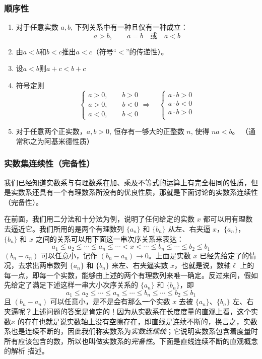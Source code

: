 \subsubsection{顺序性}
\begin{enumerate}
  \item 对于任意实数 $a,b$, 下列关系中有一种且仅有一种成立：
  \[a>b,\qquad a=b\quad \text{或}\quad a<b\]
  \item 由$a<b$和$b<c$推出$a<c$（符号“$<$”的传递性）。
  \item 设$a<b$则$a+c<b+c$
  \item 符号定则
  \[\begin{cases}
      a>0,\qquad b>0\\
      a>0,\qquad b<0\\
      a<0,\qquad b<0
  \end{cases}\Rightarrow\quad  \begin{cases}
      a\cdot b>0\\a\cdot b<0\\a\cdot b>0\\
  \end{cases}\]
  \item 对于任意两个正实数，$a,b>0$, 恒存有一够大的正整数 $n$, 使得 $na<b$。 （通常称之为阿基米德性质）
\end{enumerate}

\subsubsection{ 实数集连续性（完备性）}
我们已经知道实数系与有理数系在加、乘及不等式的运算上有完全相同的性质，但是实数系还具有一个有理数系所没有的优良性质，那就是下面讨论的实数系连续性（完备性）。

在前面，我们用二分法和十分法为例，说明了任何给定的实数 $x$ 都可以用有理数去逼近它。我们所用的是两个有理数列 $\{a_n\}$ 和 $\{b_n\}$ 从左、右夹逼 $x$，$\{a_n\}$，$\{b_n\}$ 和 $x$ 之间的关系可以用下面这一串次序关系来表达：
\[a_1\leqslant a_2\le\cdots\leqslant a_n\leqslant \cdots <x<\cdots\leqslant b_n\leqslant \cdots\leqslant b_2\leqslant b_1\]
$(b_n-a_n)$ 可以任意小，记作 $(b_n-a_n)\to 0$。上面是实数 $x$ 已经先给定了的情况，去求出两串数列 $\{a_n\}$ 和 $\{b_n\}$ 来左、右夹逼实数 $x$，也就是说，数轴$\ell$ 上的每一点，即每一个实数，能够由上述的两个有理数列来唯一确定。反过来问，假如先给定了满足下述这样一串大小次序关系的 $\{a_n\}$ 和 $\{b_n\}$，即
\[a_1\leqslant a_2\le\cdots\leqslant a_n\leqslant \cdots \leqslant b_n\leqslant \cdots\leqslant b_2\leqslant b_1\]
且 $(b_n-a_n)$ 可以任意小，是不是会有那么一个实数 $x$ 去被 $\{a_n\}$、$\{b_n\}$ 左、右夹逼呢？上述问题的答案是肯定的！因为从实数系在长度度量的直观上看，这个实数$x$ 的存在也就是说实数轴上没有空隙存在，即直线是连续不断的，换言之，实数系也是连续不断的，因此我们称实数系为\emph{实数连续统}；它说明实数系包含着度量时所有应该包含的数，所以也叫做实数系的\emph{完备性}。下面是直线连续不断的直观概念的解析
描述。

